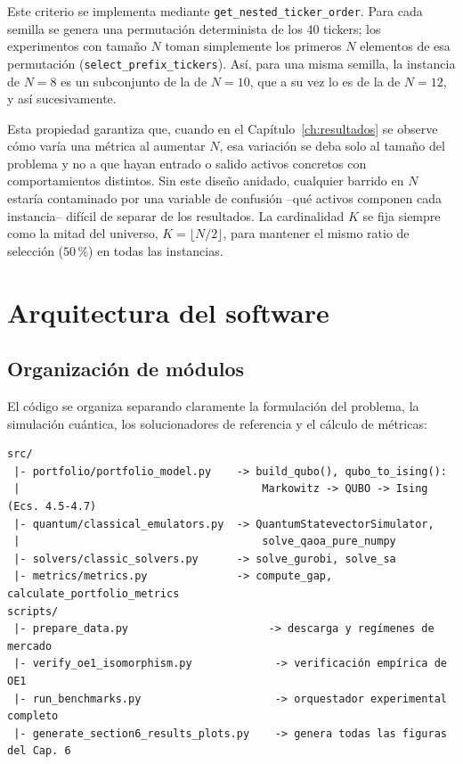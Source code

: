 Este criterio se implementa mediante \texttt{get\_nested\_ticker\_order}. Para cada semilla se genera una permutación determinista de los 40 tickers; los experimentos con tamaño $N$ toman simplemente los primeros $N$ elementos de esa permutación (\texttt{select\_prefix\_tickers}). Así, para una misma semilla, la instancia de $N=8$ es un subconjunto de la de $N=10$, que a su vez lo es de la de $N=12$, y así sucesivamente.

Esta propiedad garantiza que, cuando en el Capítulo~\ref{ch:resultados} se observe cómo varía una métrica al aumentar $N$, esa variación se deba solo al tamaño del problema y no a que hayan entrado o salido activos concretos con comportamientos distintos. Sin este diseño anidado, cualquier barrido en $N$ estaría contaminado por una variable de confusión --qué activos componen cada instancia-- difícil de separar de los resultados. La cardinalidad $K$ se fija siempre como la mitad del universo, $K = \lfloor N/2 \rfloor$, para mantener el mismo ratio de selección ($50\,\%$) en todas las instancias.

\section{Arquitectura del software}
\label{sec:arquitectura}

\subsection{Organización de módulos}

El código se organiza separando claramente la formulación del problema, la simulación cuántica, los solucionadores de referencia y el cálculo de métricas:

\begin{verbatim}
src/
 |- portfolio/portfolio_model.py    -> build_qubo(), qubo_to_ising():
 |                                      Markowitz -> QUBO -> Ising (Ecs. 4.5-4.7)
 |- quantum/classical_emulators.py  -> QuantumStatevectorSimulator,
 |                                      solve_qaoa_pure_numpy
 |- solvers/classic_solvers.py      -> solve_gurobi, solve_sa
 |- metrics/metrics.py              -> compute_gap, calculate_portfolio_metrics
scripts/
 |- prepare_data.py                      -> descarga y regímenes de mercado
 |- verify_oe1_isomorphism.py             -> verificación empírica de OE1
 |- run_benchmarks.py                     -> orquestador experimental completo
 |- generate_section6_results_plots.py    -> genera todas las figuras del Cap. 6
\end{verbatim}

